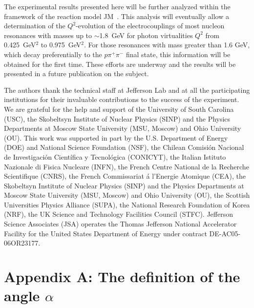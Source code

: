 \documentclass[prc,twocolumn,superscriptaddress,showpacs,amssymb,amsmath,amsfonts,aps,nofootinbib]{revtex4-1}
\begin{document}
The experimental results presented here will be further analyzed within the framework of the reaction model JM~\cite{Mokeev:2008iw,Mokeev:2012vsa,Mokeev:2015lda}. 
This analysis will eventually allow a determination of the $Q^2$-evolution of the electrocouplings of most nucleon resonances with masses up to $\sim$1.8~GeV for photon virtualities $Q^2$ from 0.425~GeV$^2$ to 0.975~GeV$^2$. For those resonances with mass greater than 1.6 GeV, which decay preferentially to the $p \pi^{+} \pi^{-}$ final state, this information will be obtained for the first time. These efforts are underway and the
results will be presented in a future publication on the subject.








\begin{acknowledgments}

The authors thank the technical staff at Jefferson Lab
and at all the participating institutions for their invaluable
contributions to the success of the experiment.
We are grateful for the help and support of the University of South Carolina (USC), the
Skobeltsyn Institute of Nuclear Physics (SINP) and the
Physics Departments at Moscow State University (MSU,
Moscow) and Ohio University (OU). 
This work was supported in part by the U.S. Department
of Energy (DOE) and National Science Foundation
(NSF), the Chilean Comisi\'on Nacional de Investigaci\'on
Cient\'ifica y Tecnol\'ogica (CONICYT), the Italian Istituto
Nazionale di Fisica Nucleare (INFN), the French Centre
National de la Recherche Scientifique (CNRS), the
French Commissariat \'a l'Energie Atomique (CEA), the
Skobeltsyn Institute of Nuclear Physics (SINP) and the
Physics Departments at Moscow State University (MSU,
Moscow) and Ohio University (OU), the Scottish Universities
Physics Alliance (SUPA), the National Research
Foundation of Korea (NRF), the UK Science and Technology
Facilities Council (STFC). Jefferson Science Associates
(JSA) operates the Thomas Jefferson National
Accelerator Facility for the United States Department of
Energy under contract DE-AC05-06OR23177.

\end{acknowledgments}

\clearpage
\section*{Appendix A: The definition of the angle $\alpha$}
\label{app_a}
\end{document}
